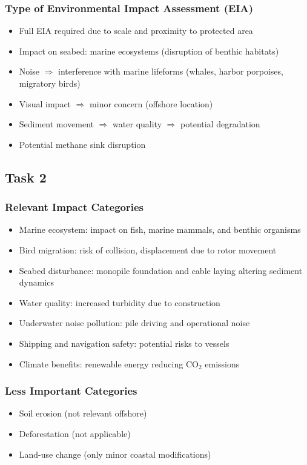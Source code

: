 \documentclass{article}
\begin{document}
\subsubsection*{Type of Environmental Impact Assessment (EIA)}
\begin{itemize}
    \item Full EIA required due to scale and proximity to protected area
    \item Impact on seabed: marine ecosystems (disruption of benthic habitats)
    \item Noise $\Rightarrow$ interference with marine lifeforms (whales, harbor porpoises, migratory birds)
    \item Visual impact $\Rightarrow$ minor concern (offshore location)
    \item Sediment movement $\Rightarrow$ water quality $\Rightarrow$ potential degradation
    \item Potential methane sink disruption
\end{itemize}

\subsection*{Task 2}
\subsubsection*{Relevant Impact Categories}
\begin{itemize}
    \item Marine ecosystem: impact on fish, marine mammals, and benthic organisms
    \item Bird migration: risk of collision, displacement due to rotor movement
    \item Seabed disturbance: monopile foundation and cable laying altering sediment dynamics
    \item Water quality: increased turbidity due to construction
    \item Underwater noise pollution: pile driving and operational noise
    \item Shipping and navigation safety: potential risks to vessels
    \item Climate benefits: renewable energy reducing CO$_2$ emissions
\end{itemize}

\subsubsection*{Less Important Categories}
\begin{itemize}
    \item Soil erosion (not relevant offshore)
    \item Deforestation (not applicable)
    \item Land-use change (only minor coastal modifications)
\end{itemize}
\end{document}
